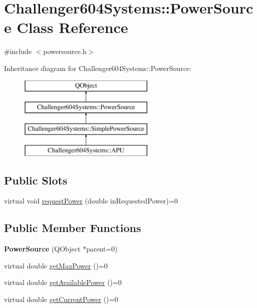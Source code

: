 \hypertarget{class_challenger604_systems_1_1_power_source}{\section{Challenger604\-Systems\-:\-:Power\-Source Class Reference}
\label{class_challenger604_systems_1_1_power_source}
}


{\ttfamily \#include $<$powersource.\-h$>$}

Inheritance diagram for Challenger604\-Systems\-:\-:Power\-Source\-:\begin{figure}[H]
\begin{center}
\leavevmode
\includegraphics[height=4.000000cm]{class_challenger604_systems_1_1_power_source}
\end{center}
\end{figure}
\subsection*{Public Slots}
\begin{DoxyCompactItemize}
\item 
virtual void \hyperlink{class_challenger604_systems_1_1_power_source_a7337c7de30e3d23c551d3a41370b34bb}{request\-Power} (double in\-Requested\-Power)=0
\end{DoxyCompactItemize}
\subsection*{Public Member Functions}
\begin{DoxyCompactItemize}
\item 
\hypertarget{class_challenger604_systems_1_1_power_source_a928bccc7b0f2533f4de701926747d910}{{\bfseries Power\-Source} (Q\-Object $\ast$parent=0)}\label{class_challenger604_systems_1_1_power_source_a928bccc7b0f2533f4de701926747d910}

\item 
virtual double \hyperlink{class_challenger604_systems_1_1_power_source_acaed7f7cc4d536770a9e51173eed1d75}{get\-Max\-Power} ()=0
\item 
virtual double \hyperlink{class_challenger604_systems_1_1_power_source_a969bc2b8f4e1f2be039851d57ddb01f6}{get\-Available\-Power} ()=0
\item 
virtual double \hyperlink{class_challenger604_systems_1_1_power_source_a76a69288fe1b32f7af5229aa6a84b717}{get\-Current\-Power} ()=0
\end{DoxyCompactItemize}


